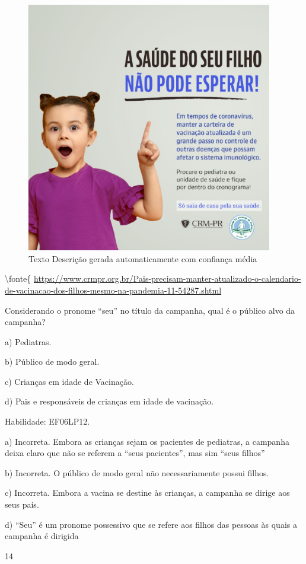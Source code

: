 {\begin{figure}
\centering
\includegraphics[width=4.23378in,height=4.3141in]{./imgSAEB_6_POR/media/image36.png}
\caption{Texto Descrição gerada automaticamente com confiança média}
\end{figure}

\textbackslash fonte\{
\url{https://www.crmpr.org.br/Pais-precisam-manter-atualizado-o-calendario-de-vacinacao-dos-filhos-mesmo-na-pandemia-11-54287.shtml}

Considerando o pronome ``seu'' no título da campanha, qual é o público
alvo da campanha?

a) Pediatras.

b) Público de modo geral.

c) Crianças em idade de Vacinação.

d) Pais e responsáveis de crianças em idade de vacinação.

Habilidade: EF06LP12.

a) Incorreta. Embora as crianças sejam os pacientes de pediatras, a
campanha deixa claro que não se referem a ``seus pacientes'', mas sim
``seus filhos''

b) Incorreta. O público de modo geral não necessariamente possui filhos.

c) Incorreta. Embora a vacina se destine às crianças, a campanha se
dirige aos seus pais.

d) ``Seu'' é um pronome possessivo que se refere aos filhos das pessoas
às quais a campanha é dirigida

\num{14}

}
